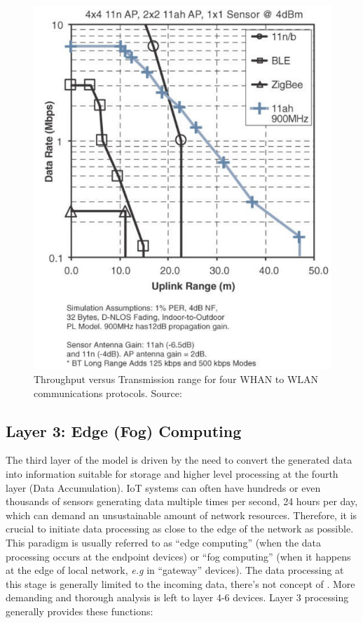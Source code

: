 \begin{figure}[H]
    \centering
    \includegraphics[width=0.55\linewidth]{images/communication-protocols-throughput.png}
    \caption{Throughput versus Transmission range for four WHAN to WLAN communications protocols. Source: \cite{10.5555/3161403}}
    \label{fig:communication-protocols-throughput}
\end{figure}

\subsection{Layer 3: Edge (Fog) Computing}
\label{sec:iot-model-layer3}


The third layer of the model is driven by the need to convert the generated data into information suitable for storage and higher level processing at the fourth layer (Data Accumulation). \acs{IoT} systems can often have hundreds or even thousands of sensors generating data multiple times per second, 24 hours per day, which can demand an unsustainable amount of network resources. Therefore, it is crucial to initiate data processing as close to the edge of the network as possible. This paradigm is usually referred to as ``edge computing'' (when the data processing occurs at the endpoint devices) or ``fog computing'' (when it happens at the edge of local network, \textit{e.g} in ``gateway'' devices). The data processing at this stage is generally limited to the incoming data, there's not concept of . More demanding and thorough analysis is left to layer 4-6 devices. Layer 3 processing generally provides these functions:

